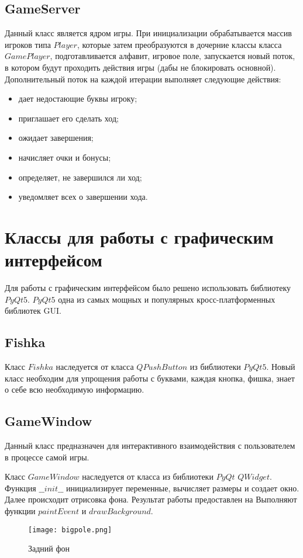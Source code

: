 \documentclass[a4paper,14pt]{article}
\begin{document}
	\subsection{GameServer}
	Данный класс является ядром игры. 
	При инициализации обрабатывается массив игроков типа $Player$, которые затем преобразуются в дочерние классы класса $GamePlayer$, подготавливается алфавит, игровое поле, запускается новый поток, в котором будут проходить действия игры (дабы не блокировать основной). 
	Дополнительный поток на каждой итерации выполняет следующие действия:
	
	\begin {itemize}
		\item дает недостающие буквы игроку;
		\item приглашает его сделать ход;
		\item ожидает завершения;
		\item начисляет очки и бонусы;
		\item определяет, не завершился ли ход;	
		\item уведомляет всех о завершении хода.
	\end {itemize}

	
\section{Классы для работы с графическим интерфейсом}
Для работы с графическим интерфейсом было решено использовать библиотеку $PyQt5$. 
$PyQt5$ одна из самых мощных и популярных кросс-платформенных библиотек GUI.
	\subsection{Fishka}
	Класс $Fishka$ наследуется от класса $QPushButton$ из библиотеки $PyQt5$. 
	Новый класс необходим для упрощения работы с буквами, каждая кнопка, фишка, знает о себе всю необходимую информацию.
	\subsection{GameWindow}
	Данный класс предназначен для интерактивного взаимодействия с пользователем в процессе самой игры.
	
	Класс $GameWindow$ наследуется от класса из библиотеки $PyQt$ $QWidget$.	
	Функция $\_\_init\_\_$  инициализирует переменные, вычисляет размеры и создает окно.	
	Далее происходит отрисовка фона.
	Результат работы предоставлен на 
	Выполняют функции $paintEvent$ и $drawBackground$.
	\begin{figure}[H]
		\centering
		\texttt{[image: bigpole.png]}
		\caption{Задний фон}
		\label{img:background}
	\end{figure}
		
\end{document}

